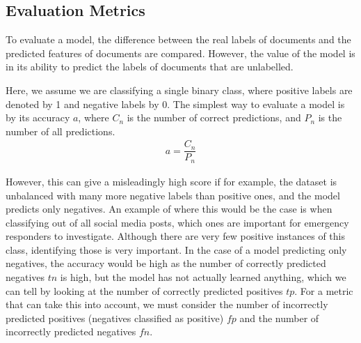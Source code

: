 

\subsection{Evaluation Metrics}\label{bg:metrics}

To evaluate a model, the difference between the real labels of documents and the predicted features of documents are compared. However, the value of the model is in its ability to predict the labels of documents that are unlabelled. 

Here, we assume we are classifying a single binary class, where positive labels are denoted by 1 and negative labels by 0. The simplest way to evaluate a model is by its accuracy $a$, where ${C_n}$ is the number of correct predictions, and $P_n$ is the number of all predictions.
\begin{align}
a = \dfrac{C_n}{ P_n}  
\end{align}

However, this can give a misleadingly high score if for example, the dataset is unbalanced with many more negative labels than positive ones, and the model predicts only negatives. An example of where this would be the case is when classifying out of all social media posts, which ones are important for emergency responders to investigate. Although there are very few positive instances of this class, identifying those is very important. In the case of a model predicting only negatives, the accuracy would be high as the number of correctly predicted negatives $\textit{tn}$ is high, but the model has not actually learned anything, which we can tell by looking at the number of correctly predicted positives $\textit{tp}$. For a metric that can take this into account, we must consider the number of incorrectly predicted positives (negatives classified as positive) $\textit{fp}$ and the number of incorrectly predicted negatives $\textit{fn}$.

